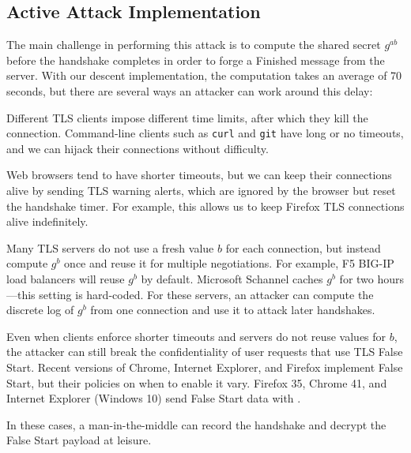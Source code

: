 \subsection{Active Attack Implementation}
The main challenge in performing this attack is to compute the shared secret $g^{ab}$ before the
handshake completes in order to forge a \textsf{Finished} message from
the server.  With our descent implementation, the computation takes an
average of 70 seconds, but there are several ways an attacker can work
around this delay:

Different TLS clients impose different time limits,
after which they kill the connection. Command-line clients such as
\texttt{curl} and \texttt{git} have
long or no timeouts, and we can hijack their connections without
difficulty.

Web browsers tend to have shorter timeouts, but we can keep their
connections alive by sending TLS warning alerts, which are ignored by
the browser but reset the handshake timer.  For example, this
allows us to keep Firefox TLS connections alive indefinitely.

Many TLS servers do not use a fresh value $b$ for each connection, but
instead compute $g^b$ once and reuse it for multiple negotiations. For example, F5 BIG-IP
load balancers will reuse $g^b$ by default. Microsoft Schannel caches
$g^b$ for two hours---this setting is hard-coded.
For these servers, an
attacker can compute the discrete log of $g^b$ from one connection and use it
to attack later handshakes.

Even when clients enforce shorter timeouts and servers do not reuse
values for $b$, the attacker can still break the confidentiality of
user requests that use TLS False Start.
Recent versions of Chrome, Internet Explorer, and Firefox
implement False Start, but their policies on when to enable it
vary. Firefox 35, Chrome 41, and Internet
Explorer (Windows 10) send False Start data with \dhe{}\@.

In these cases, a man-in-the-middle can record
the handshake and decrypt the False Start payload at leisure.


